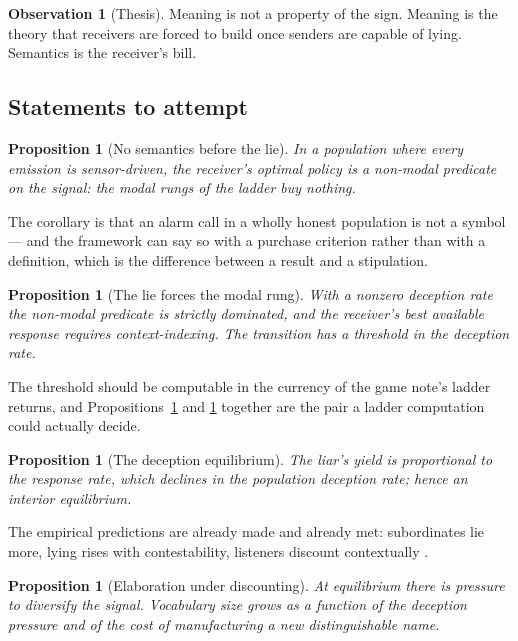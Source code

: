 \documentclass[11pt]{article}
\theoremstyle{plain}
\newtheorem{proposition}[theorem]{Proposition}
\theoremstyle{definition}
\newtheorem{observation}[theorem]{Observation}
\begin{document}
\begin{observation}[Thesis]
\label{obs:thesis}
Meaning is not a property of the sign. Meaning is the theory that receivers are forced to build once
senders are capable of lying. Semantics is the receiver's bill.
\end{observation}

\subsection{Statements to attempt}

\begin{proposition}[No semantics before the lie]
\label{prop:A}
In a population where every emission is sensor-driven, the receiver's optimal policy is a non-modal
predicate on the signal: the modal rungs of the ladder buy nothing.
\end{proposition}

The corollary is that an alarm call in a wholly honest population is not a symbol --- and the framework
can say so with a purchase criterion rather than with a definition, which is the difference between a
result and a stipulation.

\begin{proposition}[The lie forces the modal rung]
\label{prop:B}
With a nonzero deception rate the non-modal predicate is strictly dominated, and the receiver's best
available response requires context-indexing. The transition has a threshold in the deception rate.
\end{proposition}

The threshold should be computable in the currency of the game note's ladder returns, and
Propositions~\ref{prop:A} and \ref{prop:B} together are the pair a ladder computation could actually
decide.

\begin{proposition}[The deception equilibrium]
\label{prop:C}
The liar's yield is proportional to the response rate, which declines in the population deception rate;
hence an interior equilibrium.
\end{proposition}

The empirical predictions are already made and already met: subordinates lie more, lying rises with
contestability, listeners discount contextually \cite{wheeler2009,wheeler2010}.

\begin{proposition}[Elaboration under discounting]
\label{prop:D}
At equilibrium there is pressure to diversify the signal. Vocabulary size grows as a function of the
deception pressure and of the cost of manufacturing a new distinguishable name.
\end{proposition}
\end{document}
